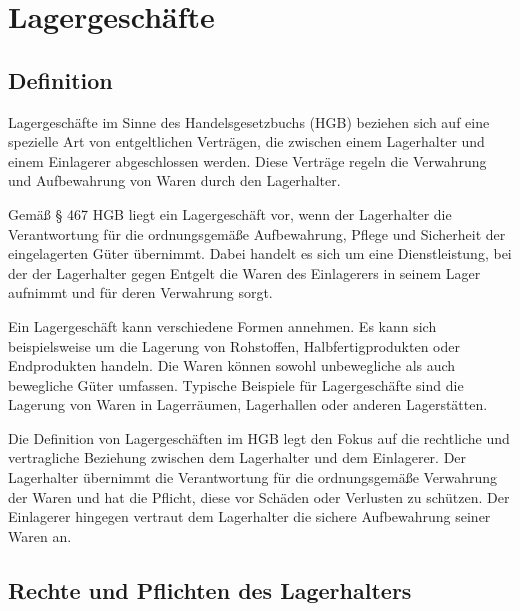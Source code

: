 

\chapter[Lagergeschäfte]{Lagergeschäfte}

\section{Definition}
Lagergeschäfte im Sinne des Handelsgesetzbuchs (HGB) beziehen sich auf eine spezielle Art von entgeltlichen Verträgen, die zwischen einem Lagerhalter und einem Einlagerer abgeschlossen werden. Diese Verträge regeln die Verwahrung und Aufbewahrung von Waren durch den Lagerhalter.

Gemäß § 467 HGB liegt ein Lagergeschäft vor, wenn der Lagerhalter die Verantwortung für die ordnungsgemäße Aufbewahrung, Pflege und Sicherheit der eingelagerten Güter übernimmt. Dabei handelt es sich um eine Dienstleistung, bei der der Lagerhalter gegen Entgelt die Waren des Einlagerers in seinem Lager aufnimmt und für deren Verwahrung sorgt.

Ein Lagergeschäft kann verschiedene Formen annehmen. Es kann sich beispielsweise um die Lagerung von Rohstoffen, Halbfertigprodukten oder Endprodukten handeln. Die Waren können sowohl unbewegliche als auch bewegliche Güter umfassen. Typische Beispiele für Lagergeschäfte sind die Lagerung von Waren in Lagerräumen, Lagerhallen oder anderen Lagerstätten.

Die Definition von Lagergeschäften im HGB legt den Fokus auf die rechtliche und vertragliche Beziehung zwischen dem Lagerhalter und dem Einlagerer. Der Lagerhalter übernimmt die Verantwortung für die ordnungsgemäße Verwahrung der Waren und hat die Pflicht, diese vor Schäden oder Verlusten zu schützen. Der Einlagerer hingegen vertraut dem Lagerhalter die sichere Aufbewahrung seiner Waren an.
\section{Rechte und Pflichten des Lagerhalters}

